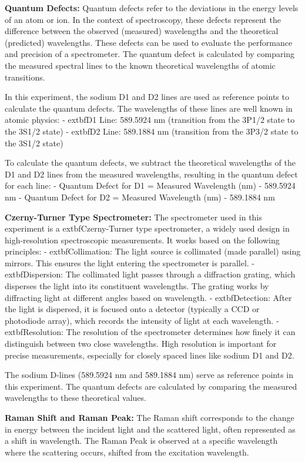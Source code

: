 \documentclass{article}
\begin{document}
\textbf{Quantum Defects:}
Quantum defects refer to the deviations in the energy levels of an atom or ion. In the context of spectroscopy, these defects represent the difference between the observed (measured) wavelengths and the theoretical (predicted) wavelengths. These defects can be used to evaluate the performance and precision of a spectrometer. The quantum defect is calculated by comparing the measured spectral lines to the known theoretical wavelengths of atomic transitions.

In this experiment, the sodium D1 and D2 lines are used as reference points to calculate the quantum defects. The wavelengths of these lines are well known in atomic physics:
- 	extbf{D1 Line}: 589.5924 nm (transition from the 3P1/2 state to the 3S1/2 state)
- 	extbf{D2 Line}: 589.1884 nm (transition from the 3P3/2 state to the 3S1/2 state)

To calculate the quantum defects, we subtract the theoretical wavelengths of the D1 and D2 lines from the measured wavelengths, resulting in the quantum defect for each line:
- Quantum Defect for D1 = Measured Wavelength (nm) - 589.5924 nm
- Quantum Defect for D2 = Measured Wavelength (nm) - 589.1884 nm

\textbf{Czerny-Turner Type Spectrometer:}
The spectrometer used in this experiment is a 	extbf{Czerny-Turner type spectrometer}, a widely used design in high-resolution spectroscopic measurements. It works based on the following principles:
- 	extbf{Collimation}: The light source is collimated (made parallel) using mirrors. This ensures the light entering the spectrometer is parallel.
- 	extbf{Dispersion}: The collimated light passes through a diffraction grating, which disperses the light into its constituent wavelengths. The grating works by diffracting light at different angles based on wavelength.
- 	extbf{Detection}: After the light is dispersed, it is focused onto a detector (typically a CCD or photodiode array), which records the intensity of light at each wavelength.
- 	extbf{Resolution}: The resolution of the spectrometer determines how finely it can distinguish between two close wavelengths. High resolution is important for precise measurements, especially for closely spaced lines like sodium D1 and D2.

The sodium D-lines (589.5924 nm and 589.1884 nm) serve as reference points in this experiment. The quantum defects are calculated by comparing the measured wavelengths to these theoretical values.

\textbf{Raman Shift and Raman Peak:}
The Raman shift corresponds to the change in energy between the incident light and the scattered light, often represented as a shift in wavelength. The Raman Peak is observed at a specific wavelength where the scattering occurs, shifted from the excitation wavelength.
\end{document}
